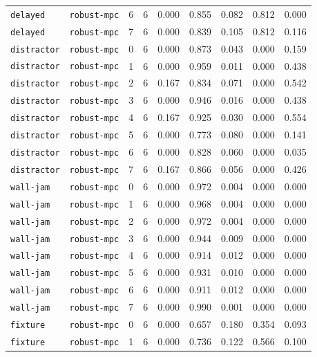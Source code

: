 \documentclass{article}
\begin{document}
\begin{center}
\begin{tabular}{lllcccccc}
\texttt{delayed} & \texttt{robust-mpc} & 6 & 6 & 0.000 & 0.855 & 0.082 & 0.812 & 0.000 \\
\texttt{delayed} & \texttt{robust-mpc} & 7 & 6 & 0.000 & 0.839 & 0.105 & 0.812 & 0.116 \\
\texttt{distractor} & \texttt{robust-mpc} & 0 & 6 & 0.000 & 0.873 & 0.043 & 0.000 & 0.159 \\
\texttt{distractor} & \texttt{robust-mpc} & 1 & 6 & 0.000 & 0.959 & 0.011 & 0.000 & 0.438 \\
\texttt{distractor} & \texttt{robust-mpc} & 2 & 6 & 0.167 & 0.834 & 0.071 & 0.000 & 0.542 \\
\texttt{distractor} & \texttt{robust-mpc} & 3 & 6 & 0.000 & 0.946 & 0.016 & 0.000 & 0.438 \\
\texttt{distractor} & \texttt{robust-mpc} & 4 & 6 & 0.167 & 0.925 & 0.030 & 0.000 & 0.554 \\
\texttt{distractor} & \texttt{robust-mpc} & 5 & 6 & 0.000 & 0.773 & 0.080 & 0.000 & 0.141 \\
\texttt{distractor} & \texttt{robust-mpc} & 6 & 6 & 0.000 & 0.828 & 0.060 & 0.000 & 0.035 \\
\texttt{distractor} & \texttt{robust-mpc} & 7 & 6 & 0.167 & 0.866 & 0.056 & 0.000 & 0.426 \\
\texttt{wall-jam} & \texttt{robust-mpc} & 0 & 6 & 0.000 & 0.972 & 0.004 & 0.000 & 0.000 \\
\texttt{wall-jam} & \texttt{robust-mpc} & 1 & 6 & 0.000 & 0.968 & 0.004 & 0.000 & 0.000 \\
\texttt{wall-jam} & \texttt{robust-mpc} & 2 & 6 & 0.000 & 0.972 & 0.004 & 0.000 & 0.000 \\
\texttt{wall-jam} & \texttt{robust-mpc} & 3 & 6 & 0.000 & 0.944 & 0.009 & 0.000 & 0.000 \\
\texttt{wall-jam} & \texttt{robust-mpc} & 4 & 6 & 0.000 & 0.914 & 0.012 & 0.000 & 0.000 \\
\texttt{wall-jam} & \texttt{robust-mpc} & 5 & 6 & 0.000 & 0.931 & 0.010 & 0.000 & 0.000 \\
\texttt{wall-jam} & \texttt{robust-mpc} & 6 & 6 & 0.000 & 0.911 & 0.012 & 0.000 & 0.000 \\
\texttt{wall-jam} & \texttt{robust-mpc} & 7 & 6 & 0.000 & 0.990 & 0.001 & 0.000 & 0.000 \\
\texttt{fixture} & \texttt{robust-mpc} & 0 & 6 & 0.000 & 0.657 & 0.180 & 0.354 & 0.093 \\
\texttt{fixture} & \texttt{robust-mpc} & 1 & 6 & 0.000 & 0.736 & 0.122 & 0.566 & 0.100 \\
\bottomrule
\end{tabular}
\end{center}
\end{document}
